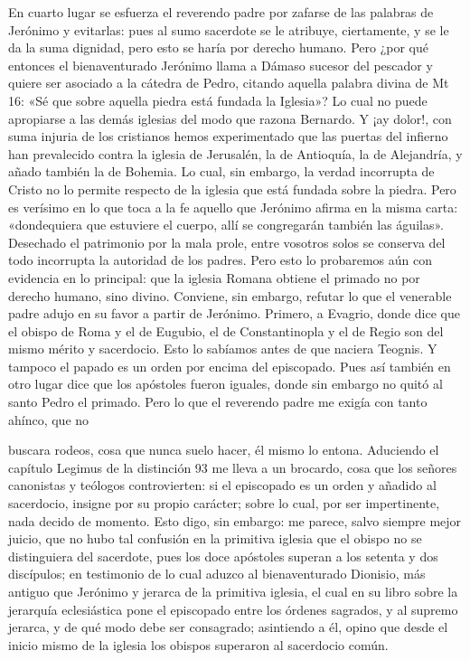 En cuarto lugar se esfuerza el reverendo padre por zafarse de las palabras de Jerónimo y evitarlas: pues al sumo sacerdote se le atribuye, ciertamente, y se le da la suma dignidad, pero esto se haría por derecho humano. Pero ¿por qué entonces el bienaventurado Jerónimo llama a Dámaso sucesor del pescador y quiere ser asociado a la cátedra de Pedro, citando aquella palabra divina de Mt 16: «Sé que sobre aquella piedra está fundada la Iglesia»? Lo cual no puede apropiarse a las demás iglesias del modo que razona Bernardo. Y ¡ay dolor!, con suma injuria de los cristianos hemos experimentado que las puertas del infierno han prevalecido contra la iglesia de Jerusalén, la de Antioquía, la de Alejandría, y añado también la de Bohemia. Lo cual, sin embargo, la verdad incorrupta de Cristo no lo permite respecto de la iglesia que está fundada sobre la piedra. Pero es verísimo en lo que toca a la fe aquello que Jerónimo afirma en la misma carta: «dondequiera que estuviere el cuerpo, allí se congregarán también las águilas». Desechado el patrimonio por la mala prole, entre vosotros solos se conserva del todo incorrupta la autoridad de los padres. Pero esto lo probaremos aún con evidencia en lo principal: que la iglesia Romana obtiene el primado no por derecho humano, sino divino. Conviene, sin embargo, refutar lo que el venerable padre adujo en su favor a partir de Jerónimo. Primero, a Evagrio, donde dice que el obispo de Roma y el de Eugubio, el de Constantinopla y el de Regio son del mismo mérito y sacerdocio. Esto lo sabíamos antes de que naciera Teognis. Y tampoco el papado es un orden por encima del episcopado. Pues así también en otro lugar dice que los apóstoles fueron iguales, donde sin embargo no quitó al santo Pedro el primado. Pero lo que el reverendo padre me exigía con tanto ahínco, que no

buscara rodeos, cosa que nunca suelo hacer, él mismo lo entona. Aduciendo el capítulo Legimus de la distinción 93 me lleva a un brocardo, cosa que los señores canonistas y teólogos controvierten: si el episcopado es un orden y añadido al sacerdocio, insigne por su propio carácter; sobre lo cual, por ser impertinente, nada decido de momento. Esto digo, sin embargo: me parece, salvo siempre mejor juicio, que no hubo tal confusión en la primitiva iglesia que el obispo no se distinguiera del sacerdote, pues los doce apóstoles superan a los setenta y dos discípulos; en testimonio de lo cual aduzco al bienaventurado Dionisio, más antiguo que Jerónimo y jerarca de la primitiva iglesia, el cual en su libro sobre la jerarquía eclesiástica pone el episcopado entre los órdenes sagrados, y al supremo jerarca, y de qué modo debe ser consagrado; asintiendo a él, opino que desde el inicio mismo de la iglesia los obispos superaron al sacerdocio común.

